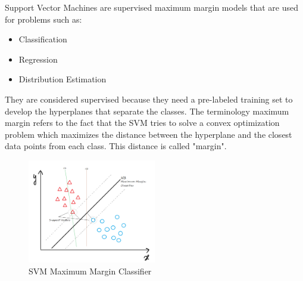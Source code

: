 Support Vector Machines are supervised maximum margin models that are used for problems 
such as:
\begin{itemize}
    \item Classification
    \item Regression
    \item Distribution Estimation
\end{itemize}
They are considered supervised because they need a pre-labeled training set to develop 
the hyperplanes that separate the classes. The terminology maximum margin refers to the
fact that the SVM tries to solve a convex optimization problem which maximizes the 
distance between the hyperplane and the closest data points from each class. This 
distance is called "margin".

\begin{figure}[H]
    \centering
    \includegraphics[width=0.5\textwidth]{media/svm_example.png}
    \caption{SVM Maximum Margin Classifier}
\end{figure}

